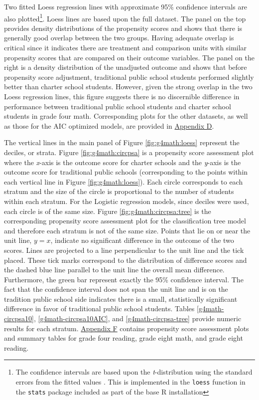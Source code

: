 \documentclass[letterpaper,12pt]{article} %
\begin{document}
Two fitted Loess regression lines with approximate 95\% confidence intervals are also plotted\footnote{The confidence intervals are based upon the \textit{t}-distribution using the standard errors from the fitted values \cite{Cleveland1992}. This is implemented in the \texttt{loess} function in the \texttt{stats} package included as part of the base R \cite{rdevelopment} installation}. Loess lines are based upon the full dataset. The panel on the top provides density distributions of the propensity scores and shows that there is generally good overlap between the two groups. Having adequate overlap is critical since it indicates there are treatment and comparison units with similar propensity scores that are compared on their outcome variables. The panel on the right is a density distribution of the unadjusted outcome and shows that before propensity score adjustment, traditional public school students performed slightly better than charter school students. However, given the strong overlap in the two Loess regression lines, this figure suggests there is no discernible difference in performance between traditional public school students and charter school students in grade four math. Corresponding plots for the other datasets, as well as those for the AIC optimized models, are provided in \hyperref[appendixD]{Appendix D}.

The vertical lines in the main panel of Figure \ref{fig:g4math:loess} represent the deciles, or strata. Figure \ref{fig:g4math:circpsa} is a propensity score assessment plot \cite{HelmreichPruzek2009} where the \textit{x}-axis is the outcome score for charter schools and the \textit{y}-axis is the outcome score for traditional public schools (corresponding to the points within each vertical line in Figure \ref{fig:g4math:loess}). Each circle corresponds to each stratum and the size of the circle is proportional to the number of students within each stratum. For the Logistic regression models, since deciles were used, each circle is of the same size. Figure \ref{fig:g4math:circpsa:tree} is the corresponding propensity score assessment plot for the classification tree model and therefore each stratum is not of the same size. Points that lie on or near the unit line, $y = x$, indicate no significant difference in the outcome of the two scores. Lines are projected to a line perpendicular to the unit line and the tick placed. These tick marks correspond to the distribution of difference scores and the dashed blue line parallel to the unit line the overall mean difference. Furthermore, the green bar represent exactly the 95\% confidence interval. The fact that the confidence interval does not span the unit line and is on the tradition public school side indicates there is a small, statistically significant difference in favor of traditional public school students. Tables \ref{g4math-circpsa10}, \ref{g4math-circpsa10AIC}, and \ref{g4math-circpsa-tree} provide numeric results for each stratum. \hyperref[appendixF]{Appendix F} contains propensity score assessment plots and summary tables for grade four reading, grade eight math, and grade eight reading.
\end{document}
